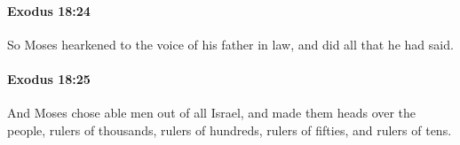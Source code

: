 		\paragraph{Exodus 18:24} %
			\label{EXODUS-18-24}

			So Moses hearkened to the voice of his father in law, and did all that he had said.


		\paragraph{Exodus 18:25} %
			\label{EXODUS-18-25}

			And Moses chose able men out of all Israel, and made them heads over the people, rulers of thousands, rulers of hundreds, rulers of fifties, and rulers of tens.


